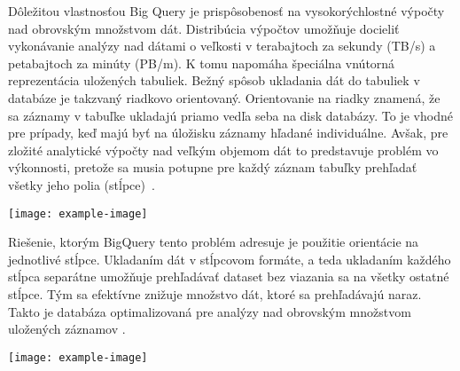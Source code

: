 Dôležitou vlastnosťou Big Query je prispôsobenosť na vysokorýchlostné výpočty nad obrovským množstvom dát.
Distribúcia výpočtov umožňuje docieliť vykonávanie analýzy nad dátami o veľkosti v terabajtoch za sekundy (TB/s) a petabajtoch za minúty (PB/m).
K tomu napomáha špeciálna vnútorná reprezentácia uložených tabuliek. 
Bežný spôsob ukladania dát do tabuliek v databáze je takzvaný riadkovo orientovaný.
Orientovanie na riadky znamená, že sa záznamy v tabuľke ukladajú priamo vedľa seba na disk databázy.
To je vhodné pre prípady, keď majú byť na úložisku záznamy hľadané individuálne.
Avšak, pre zložité analytické výpočty nad veľkým objemom dát to predstavuje problém vo výkonnosti, pretože sa musia potupne pre každý záznam tabuľky prehľadať všetky jeho polia \mbox{(stĺpce) \cite{google-bq}}.

\begin{center}
\noindent\texttt{[image: example-image]}    
\end{center}

Riešenie, ktorým BigQuery tento problém adresuje je použitie orientácie na jednotlivé stĺpce. 
Ukladaním dát v stĺpcovom formáte, a teda ukladaním každého stĺpca separátne umožňuje prehľadávať dataset bez viazania sa na všetky ostatné stĺpce.
Tým sa efektívne znižuje množstvo dát, ktoré sa prehľadávajú naraz.
Takto je databáza optimalizovaná pre analýzy nad obrovským množstvom uložených záznamov \cite{google-bq}.

\begin{center}
\noindent\texttt{[image: example-image]}    
\end{center}

